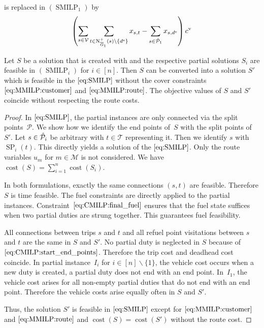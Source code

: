 is replaced in $(\operatorname{SMILP}_1)$ by
\begin{align*}
	\left(\sum_{s\in\mathcal{V}} \sum_{t\in\operatorname{N}^+_{\overline{G}_1}(s)\backslash\left\{d^{\operatorname{e}}\right\}} x_{s,t} - \sum_{s\in\hat{\mathcal{P}}_1} x_{s,d^{\operatorname{e}}}\right)c^{\operatorname{v}}
\end{align*}

\begin{theorem}
\label{thm:equivalence_heuristic_SMILP}

Let $S$ be a solution that is created with  and the respective partial solutions $S_i$ are feasible in $(\operatorname{SMILP}_i)$ for ${i\in[n]}$. Then $S$ can be converted into a solution $S'$ which is feasible in the $\eqref{eq:SMILP}$ without the cover constraints $\eqref{eq:MMILP:customer}$ and $\eqref{eq:MMILP:route}$. The objective values of $S$ and $S'$ coincide without respecting the route costs.

\end{theorem}

\begin{proof}

In $\eqref{eq:SMILP}$, the partial instances are only connected via the split points~$\mathcal{P}$. We show how we identify the end points of~$S$ with the split points of~$S'$. Let ${s\in\hat{\mathcal{P}}_i}$ be arbitrary with ${t\in\mathcal{T}}$ representing it. Then we identify $s$ with $\operatorname{SP}_i(t)$. This directly yields a solution of the $\eqref{eq:SMILP}$. Only the route variables $u_m$ for ${m\in\mathcal{M}}$ is not considered. We have ${\operatorname{cost}(S) = \sum_{i=1}^n\operatorname{cost}\left(S_i\right)}$.

In both formulations, exactly the same connections $(s,t)$ are feasible. Therefore $S$ is time feasible. The fuel constraints are directly applied to the partial instances. Constraint~$\eqref{eq:CMILP:final_fuel}$ ensures that the fuel state suffices when two partial duties are strung together. This guarantees fuel feasibility.

All connections between trips $s$ and $t$ and all refuel point visitations between $s$ and $t$ are the same in $S$ and $S'$. No partial duty is neglected in $S$ because of $\eqref{eq:CMILP:start_end_points}$. Therefore the trip cost and deadhead cost coincide. In partial instance~$I_i$ for ${i\in[n]\backslash\{1\}}$, the vehicle cost occurs when a new duty is created, \ie a partial duty does not end with an end point. In~$I_1$, the vehicle cost arises for all non-empty partial duties that do not end with an end point. Therefore the vehicle costs arise equally often in $S$ and $S'$.

Thus, the solution $S'$ is feasible in $\eqref{eq:SMILP}$ except for $\eqref{eq:MMILP:customer}$ and $\eqref{eq:MMILP:route}$ and ${\operatorname{cost}(S) = \operatorname{cost}\left(S'\right)}$ without the route cost.

\end{proof}

